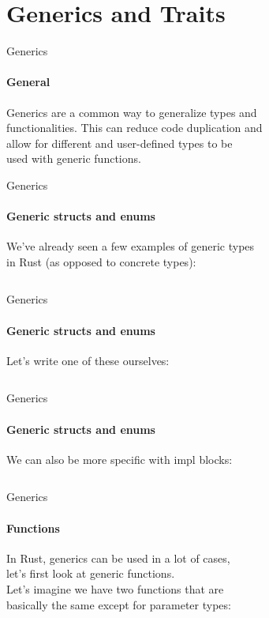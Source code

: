 \documentclass[usenames,dvipsnames,10pt,aspectratio=169]{beamer}
\begin{document}

\section{Generics and Traits}

\begin{frame}{Generics}
	\framesubtitle{General}
	\Large
	Generics are a common way to generalize types and\\
	functionalities. This can reduce code duplication and\\
	allow for different and user-defined types to be\\
	used with generic functions.\\
	\vspace{0.4cm}
\end{frame}

\begin{frame}{Generics}
	\framesubtitle{Generic structs and enums}
	\large
	We've already seen a few examples of generic types\\
	in Rust (as opposed to concrete types): 
	\vspace{0.2cm}
	\inputminted[fontsize=\large]{rust}{code/generics1.rs}
\end{frame}

\begin{frame}{Generics}
	\framesubtitle{Generic structs and enums}
	Let's write one of these ourselves:
	\vspace{0.2cm}
	\inputminted[fontsize=\large]{rust}{code/generics2.rs}
\end{frame}

\begin{frame}{Generics}
	\framesubtitle{Generic structs and enums}
	\large
	We can also be more specific with \textcolor{ucuyellow}{impl} blocks:
	\vspace{0.2cm}
	\inputminted[fontsize=\large]{rust}{code/generics3.rs}
\end{frame}

\begin{frame}{Generics}
	\framesubtitle{Functions}
	\large
	In Rust, generics can be used in a lot of cases,\\
	let's first look at \textcolor{ucuyellow}{generic functions}.\\
	\vspace{0.2cm}
	Let's imagine we have two functions that are\\
	basically the same except for parameter types:\\
	\vspace{0.2cm}
	\inputminted[fontsize=\large]{rust}{code/generics4.rs}
\end{frame}
\end{document}
